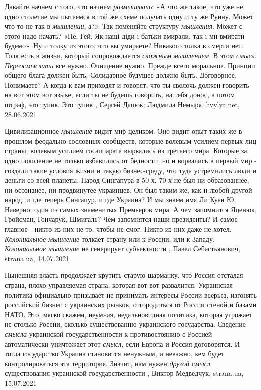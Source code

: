 Давайте начнем с того, что начнем \emph{размышлять}: «А что же такое, что уже
не одно столетие мы пытаемся в той же схеме получать одну и ту же Руину. Может
что-то не так в \emph{мышлении}, а?». Так поменяйте структуру \emph{мышления}.
Может с этого надо начать? «Не. Гей. Як наші діди і батьки вмирали, так і ми
вмирати будемо». Ну и толку из этого, что вы умираете? Никакого толка в смерти
нет. Толк есть в жизни, который сопровождается \emph{сложным мышлением}. В этом
\emph{смысл}. \emph{Переосмыслить} все нужно. Очищение нужно. Прежде всего
моральное. Принцип общего блага должен быть. Солидарное будущее должно быть.
Договорное. Понимаете? А когда к вам приходят и говорят, что ты сволочь должен
говорить на вот этом вот языке, если ты не будешь говорить, на тебя донос, а
потом штраф, это тупик. Это тупик
, 
Сергей Дацюк; Людмила Немыря, hvylya.net, 28.06.2021

Цивилизационное \emph{мышление} видит мир целиком. Оно видит опыт таких же в
прошлом феодально-сословных сообществ, которые волевым усилием первых лиц
страны, волевым усилием госаппарата вырвались из третьего мира. Которые за одно
поколение не только избавились от бедности, но и ворвались в первый мир -
создали такие условия жизни и такую бизнес-среду, что туда устремились люди и
деньги со всей планеты. Народ Сингапура в 50-х, 70-х не был ни образованнее, ни
осознанее, ни продвинутее украинцев. Он был таким же, как и любой другой народ.
и где теперь Сингапур, и где Украина?  И мы знаем имя Ли Куан Ю. Наверно, один
из самых знаменитых Премьеров мира. А чем запомнится Яценюк, Гройсман,
Гончарук, Шмигаль? Чем запомнятся наши президенты? И самое главное - никто из
них не то, чтобы не смог. Никто из них даже не хотел. \emph{Колониальное
мышление} толкает страну или к России, или к Западу.  \emph{Колониальное
мышление} не генерирует субъектности
, 
Павел Себастьянович, strana.ua, 14.07.2021

Нынешняя власть продолжает крутить старую шарманку, что Россия отсталая страна,
плохо управляемая страна, которая вот-вот развалится. Украинская политика
официально призывает не принимать интересы России всерьез, изгонять российский
бизнес с украинских рынков, отгородиться от России стеной и базами НАТО. Это,
мягко скажем, неумная, недальновидная политика, которая угрожает не столько
России, сколько существованию украинского государства. Сведение \emph{смысла}
украинской государственности к противостоянию с Россией автоматически
уничтожает этот \emph{смысл}, если Европа и Россия договорятся. И тогда государство
Украина становится ненужным, и неважно, кем будет контролироваться эта
территория. Значит, нам нужен \emph{другой смысл} существования украинской
государственности
, 
Виктор Медведчук, strana.ua, 15.07.2021

